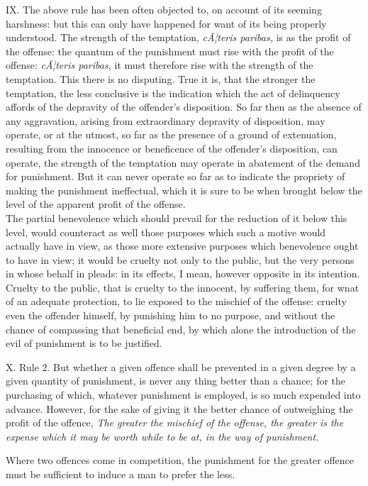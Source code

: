 \documentclass[12pt]{report}
\begin{document}
IX. The above rule has been often objected to, on account of its seeming
harshness: but this can only have happened for want of its being
properly understood. The strength of the temptation, \emph{cÃ¦teris
paribas,} is as the profit of the offense: the quantum of the punishment
must rise with the profit of the offense: \emph{cÃ¦teris paribas,} it
must therefore rise with the strength of the temptation. This there is
no disputing. True it is, that the stronger the temptation, the less
conclusive is the indication which the act of delinquency affords of the
depravity of the offender's disposition. So far then as the absence of
any aggravation, arising from extraordinary depravity of disposition,
may operate, or at the utmost, so far as the presence of a ground of
extenuation, resulting from the innocence or beneficence of the
offender's disposition, can operate, the strength of the temptation may
operate in abatement of the demand for punishment. But it can never
operate so far as to indicate the propriety of making the punishment
ineffectual, which it is sure to be when brought below the level of the
apparent profit of the offense.\\
The partial benevolence which should prevail for the reduction of it
below this level, would counteract as well those purposes which such a
motive would actually have in view, as those more extensive purposes
which benevolence ought to have in view; it would be cruelty not only to
the public, but the very persons in whose behalf in pleads: in its
effects, I mean, however opposite in its intention. Cruelty to the
public, that is cruelty to the innocent, by suffering them, for wnat of
an adequate protection, to lie exposed to the mischief of the offense:
cruelty even the offender himself, by punishing him to no purpose, and
without the chance of compassing that beneficial end, by which alone the
introduction of the evil of punishment is to be justified.

X. Rule 2. But whether a given offence shall be prevented in a given
degree by a given quantity of punishment, is never any thing better than
a chance; for the purchasing of which, whatever punishment is employed,
is so much expended into advance. However, for the sake of giving it the
better chance of outweighing the profit of the offence, \emph{The
greater the mischief of the offense, the greater is the expense which it
may be worth while to be at, in the way of punishment.}

Where two offences come in competition, the punishment for the greater
offence must be sufficient to induce a man to prefer the less.
\end{document}
